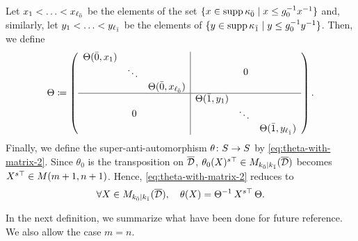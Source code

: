 Let $x_1 < \ldots < x_{\ell_{\bar{0}}}$ be the elements of the set $\{ x \in \operatorname{supp} \kappa_{\bar{0}} \mid x \leq g_0^{-1} x^{-1} \}$ and, similarly, let $y_1 < \ldots < y_{\ell_{\bar{1}}}$ be the elements of $\{ y \in \operatorname{supp} \kappa_{\bar{1}} \mid y \leq g_0^{-1} y^{-1} \}$. 
Then, we define 
\[\label{eq:puting-the-blocks-of-Phi-together-version-A}
    \sbox0{$\begin{matrix}
        \Theta(\bar 0, x_1)&& \\
        & \ddots &\\
        && \Theta(\bar 0, x_{\ell_\bz})
    \end{matrix}$}
    \sbox1{$\begin{matrix}
        \Theta(\bar 1, y_1)&& \\
        & \ddots &\\
        && \Theta(\bar 1, y_{\ell_\bo})
    \end{matrix}$}
    \Theta \coloneqq
    \left(\begin{array}{c|c}
            \usebox{0} & 0\\
            \hline
            0 & \usebox{1}
        \end{array}\right).
\]
%
Finally, we define the super-anti-automorphism $\theta\colon S\to S$ by \cref{eq:theta-with-matrix-2}. 
Since $\theta_0$ is the transposition on $\barr \D$, $\theta_0(X)\stransp \in M_{k_\bz \mid k_\bo} (\barr \D)$ becomes $X^{s\top} \in M(m+1,n+1)$. 
Hence, \cref{eq:theta-with-matrix-2} reduces to 
\[\label{eq:theta-with-matrix-3}
    \forall X\in M_{k_\bz \mid k_\bo} (\barr \D), \quad \theta(X) = \Theta\inv\, X\stransp\, \Theta.
\]

In the next definition, we summarize what have been done for future reference. 
We also allow the case $m=n$.

